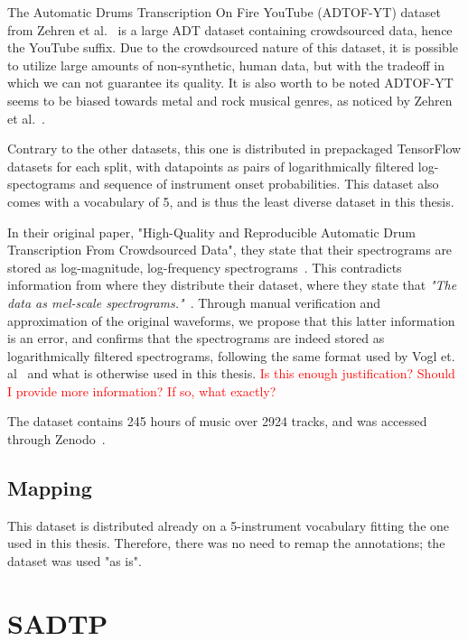 The Automatic Drums Transcription On Fire YouTube (ADTOF-YT) dataset from Zehren et al.~\cite{signals4040042} is a large \gls{ADT} dataset containing crowdsourced data, hence the YouTube suffix. Due to the crowdsourced nature of this dataset, it is possible to utilize large amounts of non-synthetic, human data, but with the tradeoff in which we can not guarantee its quality. It is also worth to be noted ADTOF-YT seems to be biased towards metal and rock musical genres, as noticed by Zehren et al.~\cite{signals4040042}.

Contrary to the other datasets, this one is distributed in prepackaged TensorFlow datasets for each split, with datapoints as pairs of logarithmically filtered log-spectograms and sequence of instrument onset probabilities. This dataset also comes with a vocabulary of 5, and is thus the least diverse dataset in this thesis.

In their original paper, "High-Quality and Reproducible Automatic Drum Transcription From Crowdsourced Data", they state that their spectrograms are stored as log-magnitude, log-frequency spectrograms~\cite{signals4040042}. This contradicts information from where they distribute their dataset, where they state that \textit{"The data as mel-scale spectrograms."}~\cite{zehren_2023_10084511}. Through manual verification and approximation of the original waveforms, we propose that this latter information is an error, and confirms that the spectrograms are indeed stored as logarithmically filtered spectrograms, following the same format used by Vogl et. al~\cite{Vogl2017DrumTV} and what is otherwise used in this thesis.
\textcolor{red}{Is this enough justification? Should I provide more information? If so, what exactly?}

The dataset contains 245 hours of music over 2924 tracks, and was accessed through Zenodo~\cite{zehren_2023_10084511}.

\subsection{Mapping}

This dataset is distributed already on a 5-instrument vocabulary fitting the one used in this thesis. Therefore, there was no need to remap the annotations; the dataset was used "as is".

\section{SADTP}

